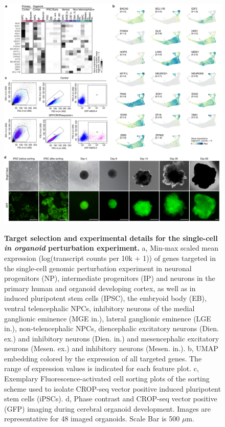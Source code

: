 \begin{figure}[h!]
    \centering
	\includegraphics[width=\textwidth]{figures/pando/Figure_S6}
    \label{fig:regS6}
    \caption{\textbf{Target selection and experimental details for the single-cell \textit{in organoid} perturbation experiment.} a, Min-max scaled mean expression (log(transcript counts per 10k + 1)) of genes targeted in the single-cell genomic perturbation experiment in neuronal progenitors (NP), intermediate progenitors (IP) and neurons in the primary human and organoid developing cortex, as well as in induced pluripotent stem cells (IPSC), the embryoid body (EB), ventral telencephalic NPCs, inhibitory neurons of the medial ganglionic eminence (MGE in.), lateral ganglionic eminence (LGE in.), non-telencephalic NPCs, diencephalic excitatory neurons (Dien. ex.) and inhibitory neurons (Dien. in.) and mesencephalic excitatory neurons (Mesen. ex.) and inhibitory neurons (Mesen. in.). b, UMAP embedding colored by the expression of all targeted genes. The range of expression values is indicated for each feature plot. c, Exemplary Fluorescence-activated cell sorting plots of the sorting scheme used to isolate CROP-seq vector positive induced pluripotent stem cells (iPSCs). d, Phase contrast and CROP-seq vector positive (GFP) imaging during cerebral organoid development. Images are representative for 48 imaged organoids. Scale Bar is 500 $\mu$m.}
\end{figure}


